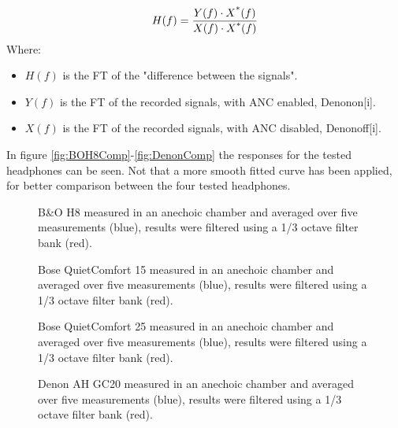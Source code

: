 \begin{equation}\label{FrequencyResponseEq2}
H(f) = \frac{Y(f) \cdot X\textsuperscript{*}(f)}{X(f) \cdot X\textsuperscript{*}(f)}
\end{equation}
Where:
\begin{itemize}
	\item $H(f)$ is the FT of the "difference between the signals".
	\item $Y(f)$ is the FT of the recorded signals, with ANC enabled,  Denonon[i].
	\item $X(f)$ is the FT of the recorded signals, with ANC disabled, Denonoff[i].
\end{itemize}

In figure \autoref{fig:BOH8Comp}-\autoref{fig:DenonComp} the responses for the tested headphones can be seen. Not that a more smooth fitted curve has been applied, for better comparison between the four tested headphones.

\begin{figure}[H]
	\centering
	
	\caption{B\&O H8 measured in an anechoic chamber and averaged over five measurements (blue), results were filtered using a 1/3 octave filter bank (red).}
	\label{fig:BOH8Comp}
\end{figure}

\begin{figure}[H]	
	\centering
	
	\caption{Bose QuietComfort 15 measured in an anechoic chamber and averaged over five measurements (blue), results were filtered using a 1/3 octave filter bank (red).}
	\label{fig:QC15Comp}
\end{figure}

\begin{figure}[H]
	\centering
	
	\caption{Bose QuietComfort 25 measured in an anechoic chamber and averaged over five measurements (blue), results were filtered using a 1/3 octave filter bank (red).}
	\label{fig:QC25Comp}
\end{figure}

\begin{figure}[H]
	\centering
	
	\caption{Denon AH GC20 measured in an anechoic chamber and averaged over five measurements (blue), results were filtered using a 1/3 octave filter bank (red).}
	\label{fig:DenonComp}
\end{figure}

